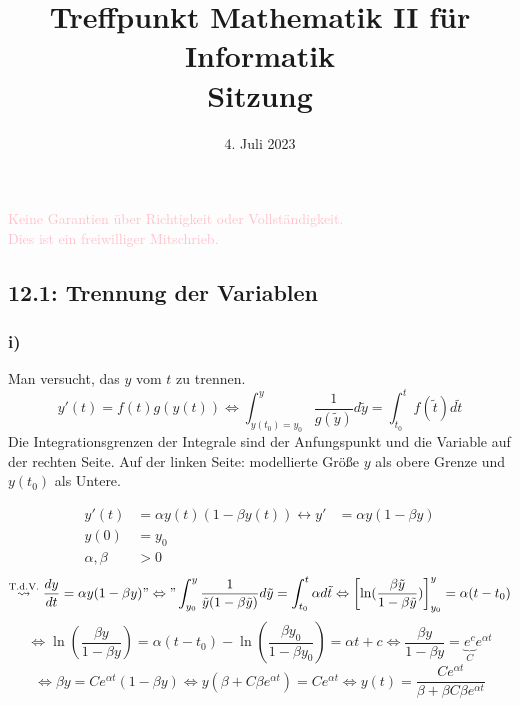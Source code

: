 \documentclass[
    accentcolor=pink,
    boxarc,
    dark_mode,
    logofile=enmpty
]{rubos-tuda-template}
\date{4. Juli 2023}
\title[trans rights <3]{Treffpunkt Mathematik II für Informatik \\ Sitzung \getSheetnumber{}}
\begin{document}
    \maketitle{}

    \begin{anmerkung}
        \huge{\textcolor{pink}{Keine Garantien über Richtigkeit oder Vollständigkeit. \\ Dies ist ein freiwilliger Mitschrieb.}}
    \end{anmerkung}

    \subsection*{12.1: Trennung der Variablen}

    \subsubsection*{i)}
    \begin{anmerkungen}
        Man versucht, das $y$ vom $t$ zu trennen.
        \[y'(t)=f(t)g(y(t)) \Leftrightarrow\int_{y(t_0)=y_0}^{y}\frac{1}{g(\tilde{y})}d\tilde{y}=\int_{t_0}^{t}f(\tilde{t})d\tilde{t}\]
        Die Integrationsgrenzen der Integrale sind der Anfungspunkt und die Variable auf der rechten Seite. Auf der linken Seite: modellierte Größe $y$ als obere Grenze und $y(t_0)$ als Untere.
    \end{anmerkungen}
    \begin{align*}
        y'(t)        & =\alpha y(t)(1-\beta y(t))\leftrightarrow y' & =\alpha y(1-\beta y) \\
        y(0)         & =y_0                                                                \\
        \alpha,\beta & >0
    \end{align*}
    \[\overset{\text{T.d.V.}}{\leadsto}\frac{dy}{dt}=\alpha y(1-\beta y)"\Leftrightarrow"\int_{y_0}^{y}\frac{1}{\tilde{y}(1-\beta\tilde{y})}d\tilde{y}=\int_{t_0}^{t}\alpha d\tilde{t}\Leftrightarrow\left[\ln(\frac{\beta\tilde{y}}{1-\beta\tilde{y}})\right]^y_{y_0}=\alpha(t-t_0)\]
    \[\Leftrightarrow\ln(\frac{\beta y}{1-\beta y})=\alpha(t-t_0)-\ln(\frac{\beta y_0}{1-\beta y_0})\mathrel{\widehat{=}}\alpha t+c\Leftrightarrow\frac{\beta y}{1-\beta y}=\underbrace{e^c}_Ce^{\alpha t}\]
    \[\Leftrightarrow\beta y=C e^{\alpha t}(1-\beta y)\Leftrightarrow y(\beta+C\beta e^{\alpha t})=C e^{\alpha t}\Leftrightarrow y(t)=\frac{C e^{\alpha t}}{\beta+\beta C\beta e^{\alpha t}}\]
\end{document}
